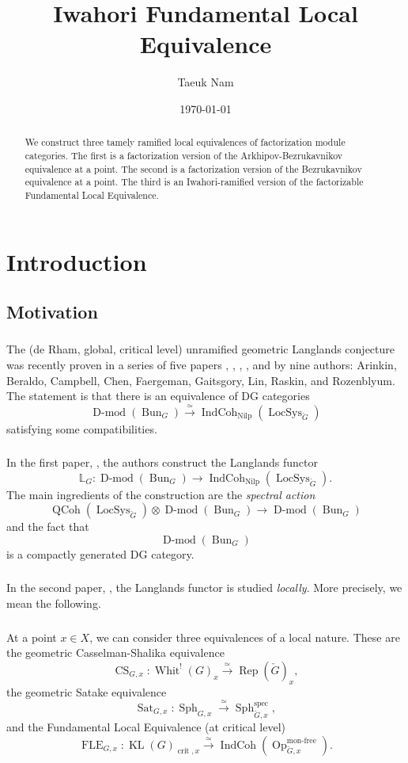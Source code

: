 \documentclass[10pt]{amsart}
\title{Iwahori Fundamental Local Equivalence}
\author{Taeuk Nam}
\date{\today}
\theoremstyle{remark}
\newcommand{\on}[1]{\operatorname{#1}}
\newcommand{\Bun}{\on{Bun}}
\newcommand{\Dmod}{\on{D-mod}}
\newcommand{\QCoh}{\on{QCoh}}
\newcommand{\IndCoh}{\on{IndCoh}}
\newcommand{\Gcheck}{\check{G}}
\newcommand{\sssec}[1]{\subsubsection{}}
\begin{document}
\begin{abstract}
    We construct three tamely ramified local equivalences of factorization module categories. The first is a factorization version of the Arkhipov-Bezrukavnikov equivalence at a point. The second is a factorization version of the Bezrukavnikov equivalence at a point. The third is an Iwahori-ramified version of the factorizable Fundamental Local Equivalence.
\end{abstract}

\maketitle

\tableofcontents


\section*{Introduction}
\subsection{Motivation}
\sssec{}
The (de Rham, global, critical level) unramified geometric Langlands conjecture was recently proven in a series of five papers \cite{GLC1}, \cite{GLC2}, \cite{GLC3}, \cite{GLC4}, and \cite{GLC5} by nine authors: Arinkin, Beraldo, Campbell, Chen, Faergeman, Gaitsgory, Lin, Raskin, and Rozenblyum. The statement is that there is an equivalence of DG categories
$$
\Dmod(\Bun_G) \overset{\simeq}{\longrightarrow} \IndCoh_{\on{Nilp}}(\on{LocSys}_{\Gcheck})
$$
satisfying some compatibilities.

\sssec{}
In the first paper, \cite{GLC1}, the authors construct the Langlands functor
$$
\mathbb{L}_G : \Dmod(\Bun_G) \longrightarrow \IndCoh_{\on{Nilp}}(\on{LocSys}_{\Gcheck}).
$$
The main ingredients of the construction are the \emph{spectral action}
$$
\QCoh(\on{LocSys}_{\Gcheck}) \otimes \Dmod(\Bun_G) \to \Dmod(\Bun_G)
$$
and the fact that 
$$
\Dmod(\Bun_G)
$$
is a compactly generated DG category.

\sssec{}
In the second paper, \cite{GLC2}, the Langlands functor is studied \emph{locally}. More precisely, we mean the following.

\sssec{}
At a point $x \in X$, we can consider three equivalences of a local nature. These are the geometric Casselman-Shalika equivalence
$$
\on{CS}_{G, x} : \on{Whit}^!(G)_{x} \overset{\simeq}{\longrightarrow} \on{Rep}(\Gcheck)_x,
$$
the geometric Satake equivalence
$$
\on{Sat}_{G, x} : \on{Sph}_{G, x} \overset{\simeq}{\longrightarrow} \on{Sph}_{\Gcheck, x}^{\on{spec}},
$$
and the Fundamental Local Equivalence (at critical level)
$$
\on{FLE}_{G, x} : \on{KL}(G)_{\on{crit}, x} \overset{\simeq}{\longrightarrow} \IndCoh(\on{Op}_{\Gcheck, x}^{\on{mon-free}}).
$$
\end{document}
